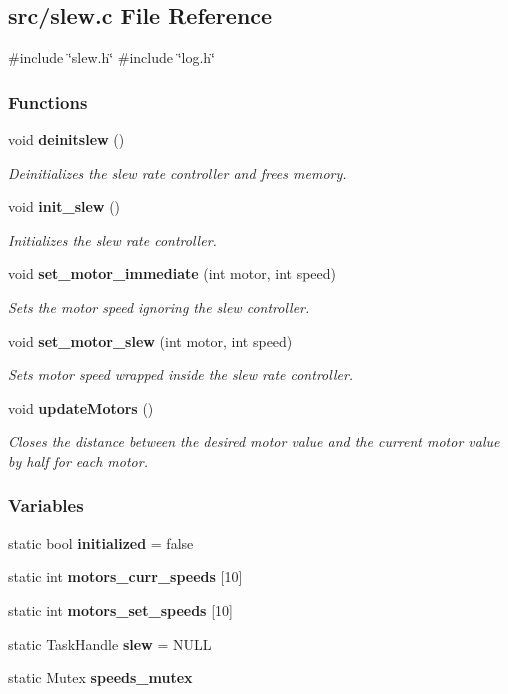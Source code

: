 \subsection{src/slew.c File Reference}
\label{a00143}
{\ttfamily \#include \char`\"{}slew.\+h\char`\"{}}\newline
{\ttfamily \#include \char`\"{}log.\+h\char`\"{}}\newline
\subsubsection*{Functions}
\begin{DoxyCompactItemize}
\item 
void \textbf{ deinitslew} ()
\begin{DoxyCompactList}\small\item\em Deinitializes the slew rate controller and frees memory. \end{DoxyCompactList}\item 
void \textbf{ init\+\_\+slew} ()
\begin{DoxyCompactList}\small\item\em Initializes the slew rate controller. \end{DoxyCompactList}\item 
void \textbf{ set\+\_\+motor\+\_\+immediate} (int motor, int speed)
\begin{DoxyCompactList}\small\item\em Sets the motor speed ignoring the slew controller. \end{DoxyCompactList}\item 
void \textbf{ set\+\_\+motor\+\_\+slew} (int motor, int speed)
\begin{DoxyCompactList}\small\item\em Sets motor speed wrapped inside the slew rate controller. \end{DoxyCompactList}\item 
void \textbf{ update\+Motors} ()
\begin{DoxyCompactList}\small\item\em Closes the distance between the desired motor value and the current motor value by half for each motor. \end{DoxyCompactList}\end{DoxyCompactItemize}
\subsubsection*{Variables}
\begin{DoxyCompactItemize}
\item 
static bool \textbf{ initialized} = false
\item 
static int \textbf{ motors\+\_\+curr\+\_\+speeds} [10]
\item 
static int \textbf{ motors\+\_\+set\+\_\+speeds} [10]
\item 
static Task\+Handle \textbf{ slew} = N\+U\+LL
\item 
static Mutex \textbf{ speeds\+\_\+mutex}
\end{DoxyCompactItemize}


